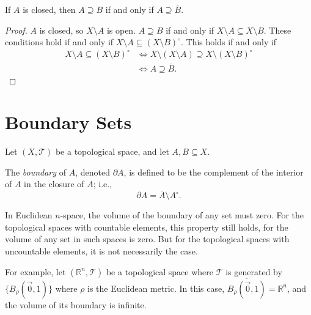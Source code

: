 \begin{proposition}
	If $A$ is closed, then $A \supseteq B$ if and only if $A \supseteq \overline B$.
	
	\begin{proof}
		$A$ is closed, so $X \setminus A$ is open. $A \supseteq B$ if and only if $X \setminus A \subseteq X \setminus B$. These conditions hold if and only if $X \setminus A \subseteq (X \setminus B)^\circ$. This holds if and only if
		$$
		\begin{aligned}
		X \setminus A \subseteq (X \setminus B)^\circ &\iff X \setminus (X \setminus A) \supseteq X \setminus (X \setminus B)^\circ \\
		&\iff A \supseteq \overline B.
		\end{aligned}
		$$
	\end{proof}
\end{proposition}


\section{Boundary Sets}

Let $(X, \mathcal T)$ be a topological space, and let $A, B \subseteq X$.

\begin{definition}
	The \textit{boundary} of $A$, denoted $\partial A$, is defined to be the complement of the interior of $A$ in the closure of $A$; i.e.,
	$$
	\partial A = \overline A \setminus A^\circ.
	$$
\end{definition}


\begin{note}
	In Euclidean $n$-space, the volume of the boundary of any set must zero. For the topological spaces with countable elements, this property still holds, for the volume of any set in such spaces is zero. But for the topological spaces with uncountable elements, it is not necessarily the case.
	
	For example, let $(\mathbb R^n, \mathcal T)$ be a topological space where $\mathcal T$ is generated by $\{ B_\rho (\vec 0, 1) \}$ where $\rho$ is the Euclidean metric. In this case, $\overline{B_\rho (\vec 0, 1)} = \mathbb R^n$, and the volume of its boundary is infinite.
\end{note}


